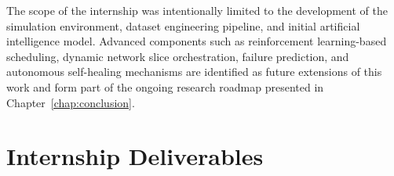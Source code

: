 \documentclass[12pt,a4paper]{report}
\begin{document}
	The scope of the internship was intentionally limited to the development of the simulation environment, dataset engineering pipeline, and initial artificial intelligence model. Advanced components such as reinforcement learning-based scheduling, dynamic network slice orchestration, failure prediction, and autonomous self-healing mechanisms are identified as future extensions of this work and form part of the ongoing research roadmap presented in Chapter~\ref{chap:conclusion}.
	
	

	
	\section{Internship Deliverables}
	\label{sec:deliverables}
	
	
\end{document}

